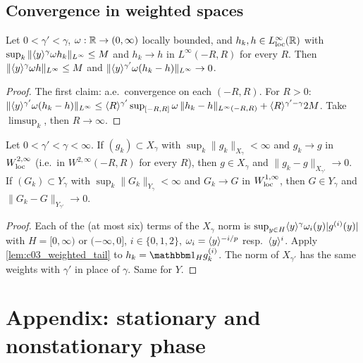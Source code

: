 \subsection{Convergence in weighted spaces}

\begin{lemma}
  \label{lem:c03_weighted_tail}
  Let $0<\gamma'<\gamma$, $\omega:\mathbb{R}\to(0,\infty)$ locally bounded, and $h_k,h\in L^\infty_{\textup{loc}}(\mathbb{R})$ with $\sup_k\|\langle y \rangle^{\gamma}\omega h_k\|_{L^\infty}\le M$ and $h_k\to h$ in $L^\infty(-R,R)$ for every $R$.
  Then $\|\langle y \rangle^\gamma\omega h\|_{L^\infty}\le M$ and $\|\langle y \rangle^{\gamma'}\omega(h_k-h)\|_{L^\infty}\to0$.
\end{lemma}
\begin{proof}
  The first claim: a.e.\ convergence on each $(-R,R)$. For $R>0$:
  $\|\langle y \rangle^{\gamma'}\omega(h_k-h)\|_{L^\infty}\le\langle R \rangle^{\gamma'}\sup_{[-R,R]}\omega\,\|h_k-h\|_{L^\infty(-R,R)}+\langle R \rangle^{\gamma'-\gamma}2M$.
  Take $\limsup_k$, then $R\to\infty$.
\end{proof}

\begin{proposition}
  \label{prop:appendix_convergence}
  Let $0<\gamma'<\gamma<\infty$. If $(g_k)\subset X_\gamma$ with $\sup_k\|g_k\|_{X_\gamma}<\infty$ and $g_k\to g$ in $W^{2,\infty}_{\textup{loc}}$ (i.e.\ in $W^{2,\infty}(-R,R)$ for every $R$), then $g\in X_\gamma$ and $\|g_k-g\|_{X_{\gamma'}}\to0$.
  If $(G_k)\subset Y_\gamma$ with $\sup_k\|G_k\|_{Y_\gamma}<\infty$ and $G_k\to G$ in $W^{1,\infty}_{\textup{loc}}$, then $G\in Y_\gamma$ and $\|G_k-G\|_{Y_{\gamma'}}\to0$.
\end{proposition}
\begin{proof}
  Each of the (at most six) terms of the $X_\gamma$ norm is $\sup_{y\in H}\langle y \rangle^\gamma\omega_i(y)|g^{(i)}(y)|$ with $H=[0,\infty)$ or $(-\infty,0]$, $i\in\{0,1,2\}$, $\omega_i=\langle y \rangle^{-i/p}$ resp.\ $\langle y \rangle^{i}$. Apply \cref{lem:c03_weighted_tail} to $h_k=\mathbbm 1_Hg_k^{(i)}$. The norm of $X_{\gamma'}$ has the same weights with $\gamma'$ in place of $\gamma$. Same for $Y$.
\end{proof}

\section{Appendix: stationary and nonstationary phase}

